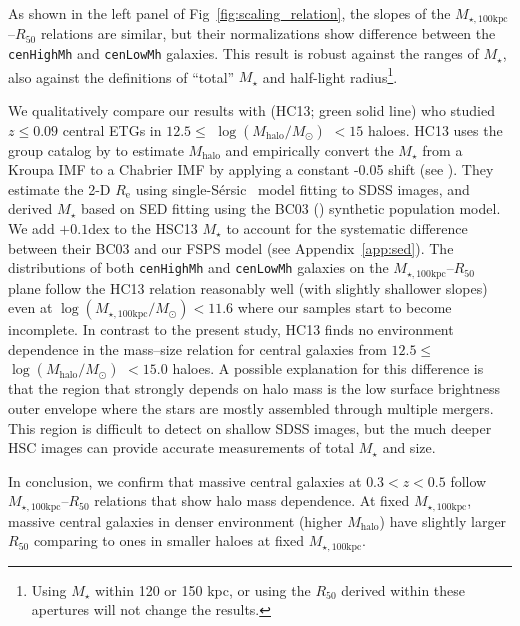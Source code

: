 \documentclass[a4paper,fleqn,usenatbib]{mnras}
\def\ser{{S\'{e}rsic\ }}
\def\rbcg{\texttt{cenHighMh}}
\def\nbcg{\texttt{cenLowMh}}
\def\mstar{{$M_{\star}$}}
\def\mhalo{{$M_{\mathrm{halo}}$}}
\def\logmh{{$\log (M_{\mathrm{halo}}/M_{\odot})$}}
\def\mtot{{$M_{\star,100\mathrm{kpc}}$}}
\def\logmtot{{$\log (M_{\star,100\mathrm{kpc}}/M_{\odot})$}}
\begin{document}
    \noindent As shown in the left panel of Fig~\ref{fig:scaling_relation}, the slopes 
    of the \mtot{}--$R_{\mathrm{50}}$ relations are similar, but their normalizations 
    show difference between the \rbcg{} and \nbcg{} galaxies. 
    This result is robust against the ranges of \mstar{}, also against the definitions 
    of  ``total'' \mstar{} and half-light radius\footnote{Using \mstar{} within 120 or 
    150 kpc, or using the $R_{\mathrm{50}}$ derived within these apertures will not 
    change the results.}.
    
    We qualitatively compare our results with \citealt{HCompany13} (HC13; green solid line) 
    who studied $z\leq 0.09$ central ETGs in $12.5 \le$ \logmh{} $< 15$ haloes. 
    HC13 uses the group catalog by \citet{Yang2007} to estimate \mhalo{} and  
    empirically convert the \mstar{} from a Kroupa IMF to a Chabrier IMF by applying 
    a constant -0.05 shift (see \citealt{Bernardi2016}).
    They estimate the 2-D $R_{\mathrm{e}}$ using single-\ser{} model fitting to SDSS 
    images, and derived \mstar{} based on SED fitting using the BC03 (\citealt{BC03}) 
    synthetic population model. 
    We add $+0.1$dex to the HSC13 \mstar{} to account for the systematic 
    difference between their BC03 and our FSPS model (see Appendix~\ref{app:sed}). 
    The distributions of both \rbcg{} and \nbcg{} galaxies on the 
    \mtot{}--$R_{\mathrm{50}}$ plane follow the HC13 relation reasonably well 
    (with slightly shallower slopes) even at \logmtot{}$< 11.6$ where our samples 
    start to become incomplete. 
    In contrast to the present study, HC13 finds no environment dependence in the 
    mass--size relation for central galaxies from $12.5\le$ \logmh{} $<15.0$ haloes.
    A possible explanation for this difference is that the region that strongly depends 
    on halo mass is the low surface brightness outer envelope where the stars are 
    mostly assembled through multiple mergers. 
    This region is difficult to detect on shallow SDSS images, but the much deeper 
    HSC images can provide accurate measurements of total \mstar{} and size.  
     
    In conclusion, we confirm that massive central galaxies at $0.3 < z < 0.5$
    follow \mtot{}--$R_{\mathrm{50}}$ relations that show halo mass dependence. 
    At fixed \mtot{}, massive central galaxies in denser environment (higher \mhalo{}) 
    have slightly larger $R_{\mathrm{50}}$ comparing to ones in smaller haloes at fixed 
    \mtot{}. 
    
\end{document}
